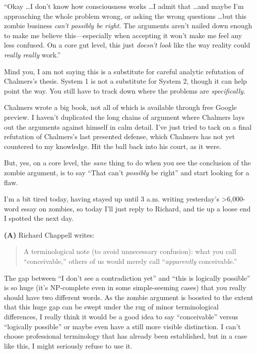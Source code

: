 {
 ``Okay \ldots I don't know how
consciousness works \ldots I admit that \ldots and maybe
I'm approaching the whole problem wrong, or asking the
wrong questions \ldots but this zombie business
\textit{can't possibly be right.} The arguments
aren't nailed down enough to make me believe
this---especially when accepting it won't make me feel
any less confused. On a core gut level, this just
\textit{doesn't look} like the way reality could
\textit{really really} work.''}

{
 Mind you, I am not saying this is a substitute for careful
analytic refutation of Chalmers's thesis. System 1 is
not a substitute for System 2, though it can help point the way. You
still have to track down where the problems are \textit{specifically}.}

{
 Chalmers wrote a big book, not all of which is available through
free Google preview. I haven't duplicated the long
chains of argument where Chalmers lays out the arguments against
himself in calm detail. I've just tried to tack on a
final refutation of Chalmers's last presented defense,
which Chalmers has not yet countered to my knowledge. Hit the ball back
into his court, as it were.}

{
 But, yes, on a core level, the \textit{sane} thing to do when you
see the conclusion of the zombie argument, is to say
``That can't \textit{possibly} be
right'' and start looking for a flaw.}

\myendsectiontext


\bigskip


{
 I'm a bit tired today, having stayed up until 3
a.m. writing yesterday's {\textgreater}6,000-word essay
on zombies, so today I'll just reply to Richard, and
tie up a loose end I spotted the next day.}

{
 \textbf{(A)} Richard Chappell writes:}

\begin{quote}
{
 A terminological note (to avoid unnecessary confusion): what you
call ``conceivable,'' others of us
would merely call ``\textit{apparently}
conceivable.''}
\end{quote}

{
 The gap between ``I don't see a
contradiction yet'' and ``this is
logically possible'' is so huge (it's
NP-complete even in some simple-seeming cases) that you really should
have two different words. As the zombie argument is boosted to the
extent that this huge gap can be swept under the rug of minor
terminological differences, I really think it would be a good idea to
say ``conceivable'' versus
``logically possible'' or maybe even
have a still more visible distinction. I can't choose
professional terminology that has already been established, but in a
case like this, I might seriously refuse to use it.}

